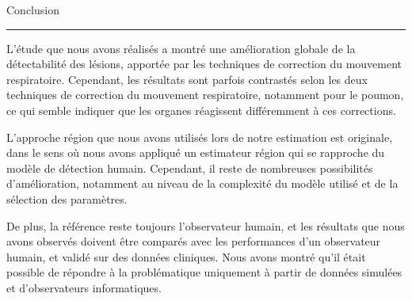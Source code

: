 

{\fontsize{30}{100}\selectfont Conclusion}


\rule{15cm}{0.1em}

\vspace{1cm}

\thispagestyle{plain}

L'étude que nous avons réalisés a montré une amélioration globale de la
détectabilité des lésions, apportée par les techniques de correction du
mouvement respiratoire. Cependant, les résultats sont parfois contrastés
selon les deux techniques de correction du mouvement respiratoire, notamment
pour le poumon, ce qui semble indiquer que les organes réagissent différemment à
ces corrections.

L'approche région que nous avons utilisés lors de notre estimation est
originale, dans le sens où nous avons appliqué un estimateur région qui se
rapproche du modèle de détection humain. Cependant, il reste de nombreuses
possibilités d'amélioration, notamment au niveau de la complexité du modèle
utilisé et de la sélection des paramètres. 

De plus, la référence reste toujours l'observateur humain, et les résultats que
nous avons observés doivent être comparés avec les performances d'un observateur
humain, et validé sur des données cliniques. Nous avons montré qu'il était
possible de répondre à la problématique uniquement à partir de données simulées
et d'observateurs informatiques.